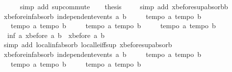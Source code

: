 \begin{isabellebody}
\ \ \ \ \isamarkupfalse%
\ {\isacharparenleft}simp\ add{\isacharcolon}\ sup{\isachardot}commute{\isacharparenright}\isanewline
\ \ \isamarkupfalse%
\ {\isacharquery}thesis\ \isamarkupfalse%
\ {}\ \isamarkupfalse%
\ {\isacharparenleft}simp\ add{\isacharcolon}\ xbefore{\isacharunderscore}sup{\isacharunderscore}absorb{\isacharunderscore}{}b{\isacharparenright}\isanewline
{}\isamarkupfalse%
%
\endisatagproof
{\isafoldproof}%
%
\isadelimproof
\isanewline
%
\endisadelimproof
\isanewline
{}\isamarkupfalse%
\ xbefore{\isacharunderscore}inf{\isacharunderscore}absorb{\isacharunderscore}{}{\isacharcolon}\ {\isachardoublequoteopen}independent{\isacharunderscore}events\ a\ b\ {\isasymLongrightarrow}\ \isanewline
\ \ {\isasymlbrakk}\ tempo{}\ a{\isacharsemicolon}\ tempo{}\ b\ {\isasymrbrakk}\ {\isasymLongrightarrow}\isanewline
\ \ {\isasymlbrakk}\ tempo{}\ a{\isacharsemicolon}\ tempo{}\ b\ {\isasymrbrakk}\ {\isasymLongrightarrow}\isanewline
\ \ {\isasymlbrakk}\ tempo{}\ a{\isacharsemicolon}\ tempo{}\ b\ {\isasymrbrakk}\ {\isasymLongrightarrow}\isanewline
\ \ {\isasymlbrakk}\ tempo{}\ a{\isacharsemicolon}\ tempo{}\ b\ {\isasymrbrakk}\ {\isasymLongrightarrow}\isanewline
\ \ inf\ a\ {\isacharparenleft}xbefore\ a\ b{\isacharparenright}\ {\isacharequal}\ xbefore\ a\ b{\isachardoublequoteclose}\isanewline
%
\isadelimproof
%
\endisadelimproof
%
\isatagproof
{}\isamarkupfalse%
\ {\isacharparenleft}simp\ add{\isacharcolon}\ local{\isachardot}inf{\isacharunderscore}absorb{}\ local{\isachardot}le{\isacharunderscore}iff{\isacharunderscore}sup\ xbefore{\isacharunderscore}sup{\isacharunderscore}absorb{\isacharunderscore}{}{\isacharparenright}%
\endisatagproof
{\isafoldproof}%
%
\isadelimproof
\isanewline
%
\endisadelimproof
\isanewline
{}\isamarkupfalse%
\ xbefore{\isacharunderscore}inf{\isacharunderscore}absorb{\isacharunderscore}{}{\isacharcolon}\ {\isachardoublequoteopen}independent{\isacharunderscore}events\ a\ b\ {\isasymLongrightarrow}\ \isanewline
\ \ {\isasymlbrakk}\ tempo{}\ a{\isacharsemicolon}\ tempo{}\ b\ {\isasymrbrakk}\ {\isasymLongrightarrow}\isanewline
\ \ {\isasymlbrakk}\ tempo{}\ a{\isacharsemicolon}\ tempo{}\ b\ {\isasymrbrakk}\ {\isasymLongrightarrow}\isanewline
\ \ {\isasymlbrakk}\ tempo{}\ a{\isacharsemicolon}\ tempo{}\ b\ {\isasymrbrakk}\ {\isasymLongrightarrow}\isanewline

\end{isabellebody}
